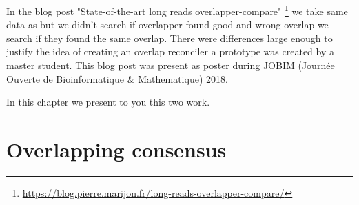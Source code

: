\documentclass[main.tex]{subfiles}
\begin{document}
In the blog post "State-of-the-art long reads overlapper-compare" \footnote{\url{https://blog.pierre.marijon.fr/long-reads-overlapper-compare/}} we take same data as \cite{ovl_bench} but we didn't search if overlapper found good and wrong overlap we search if they found the same overlap. There were differences large enough to justify the idea of creating an overlap reconciler a prototype was created by a master student. 
This blog post was present as poster during JOBIM (Journée Ouverte de Bioinformatique \& Mathematique) 2018.


In this chapter we present to you this two work.



%


\section{Overlapping consensus}\label{section:preassembly:ovl_consensus}

\end{document}

